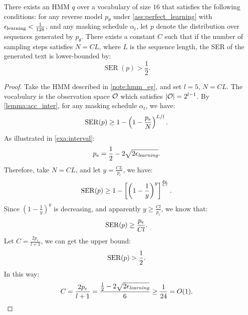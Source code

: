 \begin{theorem}
    There exists an HMM $q$ over a vocabulary of size $16$ that satisfies the following conditions: for any reverse model $p_\mathsf{\theta}$ under \cref{ass:perfect_learning} with ${\epsilon}_\mathrm{learning}<\frac{1}{128}$, and any masking schedule $\alpha_t$, let $p$ denote the distribution over sequences generated by $p_\mathsf{\theta}$. There exists a constant $C$ such that if the number of sampling steps satisfies $N = CL$, where $L$ is the sequence length, the SER of the generated text is lower-bounded by:
    \begin{equation*}
        \operatorname{SER}(p) > \frac{1}{2}.
    \end{equation*}
\end{theorem}

\begin{proof}
    Take the HMM described in \cref{note:hmm_eg}, and set $l=5$, $N=CL$. The vocabulary is the observation space ${\mathcal{O}}$ which satisfies $|{\mathcal{O}}|=2^{l-1}$. By \cref{lemma:acc_inter}, for any masking schedule $\alpha_t$, we have:
    $$\operatorname{SER}(p)\geq 1-\left(1-\frac{p_e}{N}\right)^{L/l}.$$
    As illustrated in \cref{exa:interval}:
    $$p_e=\frac{1}{2}-2\sqrt{2{\epsilon}_\textit{learning}}.$$
    Therefore, take $N=CL$, and let $y=\frac{CL}{p_e}$, we have:
    $$\operatorname{SER}(p)\geq 1-\left[\left(1-\frac{1}{y}\right)^y\right]^\frac{p_e}{Cl}.$$
    Since $(1-\frac{1}{y})^y$ is decreasing, and apparently $y\geq \frac{Cl}{p_e}$, we know that:
    $$\operatorname{SER}(p)\geq \frac{p_e}{Cl}.$$
    Let $C=\frac{2p_e}{l+1}$, we can get the upper bound:
    $$\operatorname{SER}(p)>\frac{1}{2}.$$
    In this way:
    $$C=\frac{2p_e}{l+1}=\frac{\frac{1}{2}-2\sqrt{2{\epsilon}_\textit{learning}}}{6}\geq \frac{1}{24}=O(1).$$
\end{proof}



